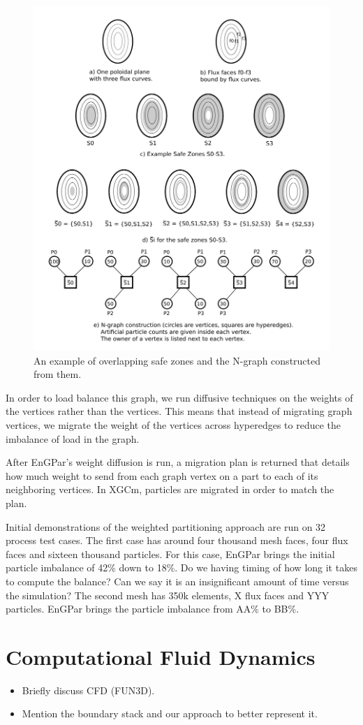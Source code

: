 \documentclass[conference]{IEEEtran}
\begin{document}
\begin{figure}[!ht]
  \centering
  \includegraphics[width=.4\textwidth]{../figures/xgcm_ngraph_construction.png}
  \caption{An example of overlapping safe zones and the N-graph constructed from them.}
  \label{fig:sbars}
\end{figure}

In order to load balance this graph, we run diffusive techniques on the weights of the vertices
rather than the vertices. This means that instead of migrating graph vertices, we migrate the
weight of the vertices across hyperedges to reduce the imbalance of load in the graph.

After EnGPar's weight diffusion is run, a migration plan is returned that details how
much weight to send from each graph vertex on a part to each of its neighboring vertices.
In XGCm, particles are migrated in order to match the plan.

Initial demonstrations of the weighted partitioning approach are run on 32
process test cases.
The first case has around four thousand
mesh faces, four flux faces and sixteen thousand particles. For this case, EnGPar brings the
initial particle imbalance of 42\% down to 18\%. {\color{red} Do we having
timing of how long it takes to compute the balance?  Can we say it is an
insignificant amount of time versus the simulation?}
The second mesh has 350k elements, X flux faces and YYY particles. EnGPar brings the
particle imbalance from AA\% to BB\%.

\section{Computational Fluid Dynamics}

\begin{itemize}
\item Briefly discuss CFD (FUN3D).
\item Mention the boundary stack and our approach to better represent it.
\end{itemize}
\end{document}
